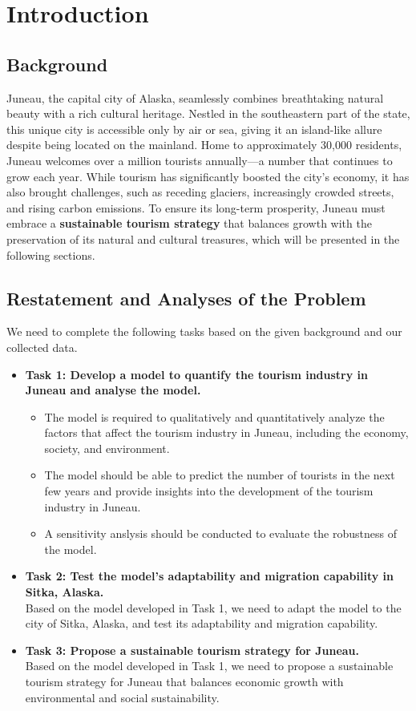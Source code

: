 \section{Introduction}

\subsection{Background}

Juneau, the capital city of Alaska, seamlessly combines 
breathtaking natural beauty with a rich cultural heritage. 
Nestled in the southeastern part of the state, this unique city 
is accessible only by air or sea, giving it an island-like allure 
despite being located on the mainland. Home to approximately 30,000 
residents, Juneau welcomes over a million tourists annually—a number 
that continues to grow each year. While tourism has significantly 
boosted the city’s economy, it has also brought challenges, such 
as receding glaciers, increasingly crowded streets, and rising 
carbon emissions. To ensure its long-term prosperity, Juneau 
must embrace a \textbf{sustainable tourism strategy} that balances growth 
with the preservation of its natural and cultural treasures, which will be
presented in the following sections.


\subsection{Restatement and Analyses of the Problem}

We need to complete the following tasks based on the given background
and our collected data.

\begin{itemize}
    \item \textbf{Task 1: Develop a model to quantify the tourism industry in Juneau and analyse the model.}
    \begin{itemize}
        \item The model is required to qualitatively and quantitatively analyze the factors that affect the tourism industry in Juneau, including the economy, society, and environment. 
        \item The model should be able to predict the number of tourists in the next few years and provide insights into the development of the tourism industry in Juneau.
        \item A sensitivity anslysis should be conducted to evaluate the robustness of the model.
    \end{itemize}
    \item \textbf{Task 2: Test the model's adaptability and migration capability in Sitka, Alaska.}
    \\Based on the model developed in Task 1, we need to adapt the model to the city of Sitka, Alaska, and test its adaptability and migration capability.
    \item \textbf{Task 3: Propose a sustainable tourism strategy for Juneau.}
    \\Based on the model developed in Task 1, we need to propose a sustainable tourism strategy for Juneau that balances economic growth with environmental and social sustainability.
\end{itemize}

